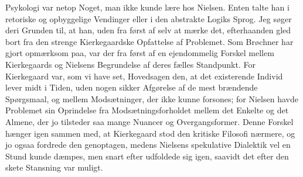 \documentclass[12pt,a4paper,openany]{book}
\begin{document}
Psykologi var netop Noget, man ikke kunde lære hos Nielsen. Enten talte han i
retoriske og opbyggelige Vendinger eller i den abstrakte Logiks Sprog. Jeg
søger deri Grunden til, at han, uden fra først af selv at mærke det,
efterhaanden gled bort fra den strenge Kierkegaardske Opfattelse af Problemet.
Som Brøchner har gjort opmærksom paa, var der fra først af en ejendommelig
Forskel mellem Kierkegaards og Nielsens Begrundelse af deres fælles Standpunkt.
For Kierkegaard var, som vi have set, Hovedsagen den, at det existerende
Individ lever midt i Tiden, uden nogen sikker Afgørelse af de mest brændende
Spørgsmaal, og mellem Modsætninger, der ikke kunne forsones; for Nielsen havde
Problemet sin Oprindelse fra Modsætningsforholdet mellem det Enkelte og det
Almene, der jo tilsteder saa mange Nuancer og Overgangsformer. Denne Forskel
hænger igen sammen med, at Kierkegaard stod den kritiske Filosofi nærmere, og
jo ogsaa fordrede den genoptagen, medens Nielsens spekulative Dialektik vel en
Stund kunde dæmpes, men snart efter udfoldede sig igen, saavidt det efter den
skete Stansning var muligt.
\end{document}
